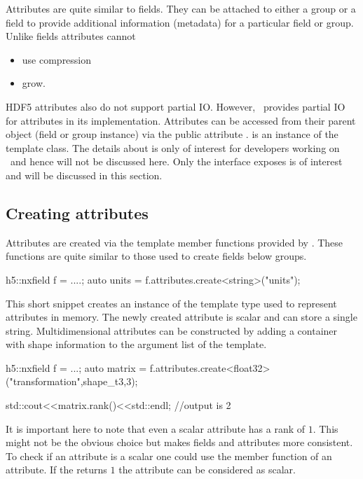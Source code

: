
Attributes are quite similar to fields. They can be attached to either a group
or a field to provide additional information (metadata) for a particular field
or group. Unlike fields attributes cannot 
\begin{itemize}
\item use compression
\item grow.
\end{itemize}
HDF5 attributes also do not support partial IO. However, \libpniio\ provides
partial IO for attributes in its implementation.
Attributes can be accessed from their parent object (field or group instance)
via the public attribute .  is an instance of 
the  template class. The details about
 is only of interest for developers working on
\libpniio\ and hence will not be discussed here. Only the interface
 exposes is of interest and will be discussed in this
section. 

\subsection{Creating attributes}

Attributes are created via the  template member functions 
provided by . These functions are quite similar to
those used to create fields below groups. 
\begin{cppcode}
h5::nxfield f = ....;
auto units = f.attributes.create<string>("units");
\end{cppcode}
This short snippet creates an instance of  the template 
type used to represent attributes in memory. The newly created attribute 
is scalar and can store a single string. 
Multidimensional attributes can be constructed by adding a container with 
shape information to the argument list of the  template.
\begin{cppcode}
h5::nxfield f = ...;
auto matrix = f.attributes.create<float32>("transformation",shape_t{3,3});

std::cout<<matrix.rank()<<std::endl; //output is 2
\end{cppcode}
It is important here to note that even a scalar attribute has a rank of $1$. 
This might not be the obvious choice but makes fields and attributes more 
consistent. To check if an attribute is a scalar one could use the 
member function of an attribute. If the  returns $1$ the attribute
can be considered as scalar.

